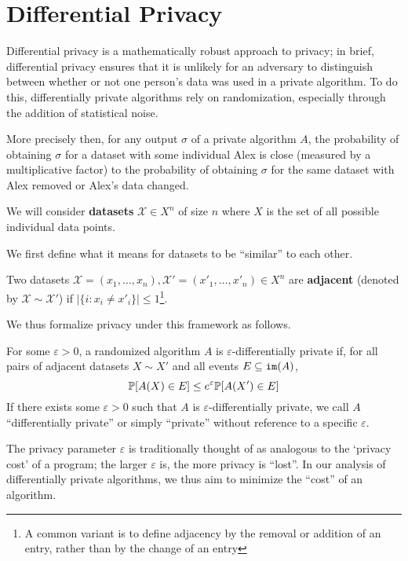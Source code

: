 
\section{Differential Privacy}

Differential privacy is a mathematically robust approach to privacy; in brief, differential privacy ensures that it is unlikely for an adversary to distinguish between whether or not one person's data was used in a private algorithm. To do this, differentially private algorithms rely on randomization, especially through the addition of statistical noise.

More precisely then, for any output $\sigma$ of a private algorithm $A$, the probability of obtaining $\sigma$ for a dataset with some individual Alex is close (measured by a multiplicative factor) to the probability of obtaining $\sigma$ for the same dataset with Alex removed or Alex's data changed.

We will consider \textbf{datasets} $\mathcal{X}\in X^n$ of size $n$ where $X$ is the set of all possible individual data points.

We first define what it means for datasets to be ``similar'' to each other. 

\begin{defn}
    Two datasets $\mathcal{X}=(x_1, \ldots, x_n), \mathcal{X}'=(x'_1, \ldots, x'_n)\in X^n$ are \textbf{adjacent} (denoted by $\mathcal{X}\sim\mathcal{X}'$) if $|\{i: x_i\neq x'_i\}|\leq 1$\footnote{A common variant is to define adjacency by the removal or addition of an entry, rather than by the change of an entry}.
\end{defn}

We thus formalize privacy under this framework as follows.
\begin{defn}
    For some $\varepsilon>0$, a randomized algorithm $A$ is $\varepsilon$-differentially private if, for all pairs of adjacent datasets $X\sim X'$ and all events $E \subseteq \texttt{im}(A)$, \[\mathbb{P}[A(X) \in E]\leq e^\varepsilon \mathbb{P}[A(X')\in E]\]
    If there exists some $\varepsilon>0$ such that $A$ is $\varepsilon$-differentially private, we call $A$ ``differentially private'' or simply ``private'' without reference to a specific $\varepsilon$.
\end{defn}

The privacy parameter $\varepsilon$ is traditionally thought of as analogous to the `privacy cost' of a program; the larger $\varepsilon$ is, the more privacy is ``lost''. In our analysis of differentially private algorithms, we thus aim to minimize the ``cost'' of an algorithm.

